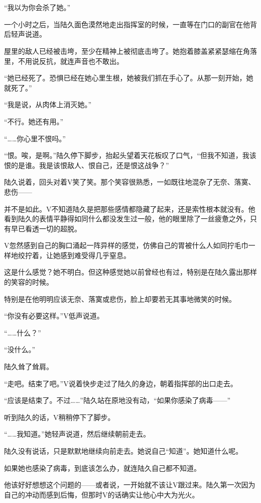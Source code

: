 \section*{}

“我以为你会杀了她。”

一个小时之后，当陆久面色漠然地走出指挥室的时候，一直等在门口的副官在他背后轻声说道。

屋里的敌人已经被击垮，至少在精神上被彻底击垮了。她抱着膝盖紧紧瑟缩在角落里，不用说反抗，就连声音也不敢出。

“她已经死了。恐惧已经在她心里生根，她被我们抓在手心了。从那一刻开始，她就死了。”

“我是说，从肉体上消灭她。”

“不行。她还有用。”

“……你心里不恨吗。”

“恨。唉，是啊。”陆久停下脚步，抬起头望着天花板叹了口气，“但我不知道，我该恨的是谁。我是该恨敌人、恨自己，还是恨这战争？”

陆久说着，回头对着V笑了笑。那个笑容很熟悉，一如既往地混杂了无奈、落寞、悲伤——

并不是如此。V不知道陆久是把那些感情都隐藏了起来，还是索性根本就没有。他看到陆久的表情平静得如同什么都没发生过一般，他的眼里除了一丝疲惫之外，只有早已看透一切的超脱。

V忽然感到自己的胸口涌起一阵异样的感觉，仿佛自己的胃被什么人如同拧毛巾一样地绞拧着，让她感到难受得几乎窒息。

这是什么感觉？她不明白。但这种感觉她以前曾经也有过，特别是在陆久露出那样的笑容的时候。

特别是在他明明应该无奈、落寞或悲伤，脸上却要若无其事地微笑的时候。

“你没有必要这样。”V低声说道。

“……什么？”

“没什么。”

陆久耸了耸肩。

“走吧。结束了吧。”V说着快步走过了陆久的身边，朝着指挥部的出口走去。

“应该是结束了。不过……”陆久站在原地没有动，“如果你感染了病毒——”

听到陆久的话，V稍稍停下了脚步。

“……我知道。”她轻声说道，然后继续朝前走去。

陆久没有说话，只是默默地继续向前走去。她说自己“知道”。她知道什么呢。

如果她也感染了病毒，到底该怎么办，就连陆久自己都不知道。

他该好好想想这个问题的——或者说，一开始就不该让V跟过来。陆久第一次因为自己的冲动而感到后悔，但那时V的话确实让他心中大为光火。

